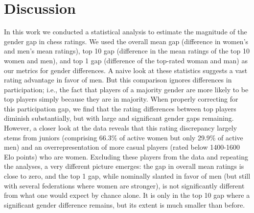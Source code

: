 \documentclass[9pt,twocolumn,twoside,lineno]{pnas-new}
\begin{document}
\section*{Discussion}

In this work we conducted a statistical analysis to estimate the magnitude of the gender gap in chess ratings. We used the overall mean gap (difference in women's and men's mean ratings), top 10 gap (difference in the mean ratings of the top 10 women and men), and top 1 gap (difference of the top-rated woman and man) as our metrics for gender differences. A naive look at these statistics suggests a vast rating advantage in favor of men. But this comparison ignores differences in participation; i.e., the fact that players of a majority gender are more likely to be top players simply because they are in majority. When properly correcting for this participation gap, we find that the rating differences between top players diminish substantially, but with large and significant gender gaps remaining. However, a closer look at the data reveals that this rating discrepancy largely stems from juniors (comprising 66.3\% of active women but only 29.9\% of active men) and an overrepresentation of more casual players (rated below 1400-1600 Elo points) who are women. Excluding these players from the data and repeating the analyses, a very different picture emerges: the gap in overall mean ratings is close to zero, and the top 1 gap, while nominally slanted in favor of men (but still with several federations where women are stronger), is not significantly different from what one would expect by chance alone. It is only in the top 10 gap where a significant gender difference remains, but its extent is much smaller than before.
\end{document}
